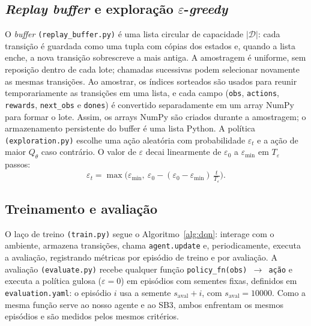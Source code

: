 \documentclass[conference]{IEEEtran}
\begin{document}
\subsection{\textit{Replay buffer} e exploração $\varepsilon$-\textit{greedy}}
O \textit{buffer} \texttt{(replay\_buffer.py)} é uma lista circular de capacidade $|\mathcal{D}|$: cada transição é guardada como uma tupla com cópias dos estados e, quando a lista enche, a nova transição sobrescreve a mais antiga. A amostragem é uniforme, sem reposição dentro de cada lote; chamadas sucessivas podem selecionar novamente as mesmas transições. Ao amostrar, os índices sorteados são usados para reunir temporariamente as transições em uma lista, e cada campo (\texttt{obs}, \texttt{actions}, \texttt{rewards}, \texttt{next\_obs} e \texttt{dones}) é convertido separadamente em um array NumPy para formar o lote. Assim, os arrays NumPy são criados durante a amostragem; o armazenamento persistente do buffer é uma lista Python. A política \texttt{(exploration.py)} escolhe uma ação aleatória com probabilidade $\varepsilon_t$ e a ação de maior $Q_\theta$ caso contrário. O valor de $\varepsilon$ decai linearmente de $\varepsilon_0$ a $\varepsilon_{\min}$ em $T_\varepsilon$ passos:
\begin{equation}
\varepsilon_t=\max\!\Big(\varepsilon_{\min},\ \varepsilon_0-(\varepsilon_0-\varepsilon_{\min})\,\tfrac{t}{T_\varepsilon}\Big).
\end{equation}

\subsection{Treinamento e avaliação}
O laço de treino \texttt{(train.py)} segue o Algoritmo~\ref{alg:dqn}: interage com o ambiente, armazena transições, chama \texttt{agent.update} e, periodicamente, executa a avaliação, registrando métricas por episódio de treino e por avaliação. A avaliação \texttt{(evaluate.py)} recebe qualquer função \texttt{policy\_fn(obs) $\rightarrow$ ação} e executa a política gulosa ($\varepsilon=0$) em episódios com sementes fixas, definidos em \texttt{evaluation.yaml}: o episódio $i$ usa a semente $s_{\text{aval}}+i$, com $s_{\text{aval}}=10000$. Como a mesma função serve ao nosso agente e ao SB3, ambos enfrentam os mesmos episódios e são medidos pelos mesmos critérios.
\end{document}
